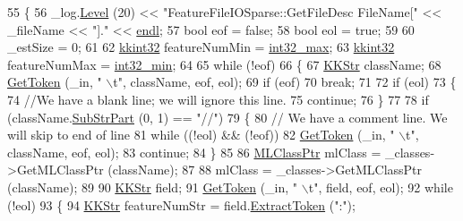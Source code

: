 \begin{DoxyCode}
55 \{
56   \_log.\hyperlink{class_k_k_b_1_1_run_log_a32cf761d7f2e747465fd80533fdbb659}{Level} (20) << \textcolor{stringliteral}{"FeatureFileIOSparse::GetFileDesc     FileName["} << \_fileName << \textcolor{stringliteral}{"]."} << 
      \hyperlink{namespace_k_k_b_ad1f50f65af6adc8fa9e6f62d007818a8}{endl};
57   \textcolor{keywordtype}{bool}  eof = \textcolor{keyword}{false};
58   \textcolor{keywordtype}{bool}  eol = \textcolor{keyword}{true};
59 
60   \_estSize = 0;
61 
62   \hyperlink{namespace_k_k_b_a8fa4952cc84fda1de4bec1fbdd8d5b1b}{kkint32}  featureNumMin = \hyperlink{_k_k_base_types_8h_ab1240c5d3fea865121ed4684f8e968f6}{int32\_max};
63   \hyperlink{namespace_k_k_b_a8fa4952cc84fda1de4bec1fbdd8d5b1b}{kkint32}  featureNumMax = \hyperlink{_k_k_base_types_8h_ab29398e623aa9027f097627dcc23e943}{int32\_min};
64 
65   \textcolor{keywordflow}{while}  (!eof)
66   \{
67     \hyperlink{class_k_k_b_1_1_k_k_str}{KKStr}  className;
68     \hyperlink{class_k_k_m_l_l_1_1_feature_file_i_o_ae79ac82b32e63fa7e7d96c833b5631f2}{GetToken} (\_in, \textcolor{stringliteral}{" \(\backslash\)t"}, className, eof, eol);
69     \textcolor{keywordflow}{if}  (eof)
70       \textcolor{keywordflow}{break};
71 
72     \textcolor{keywordflow}{if}  (eol)
73     \{
74       \textcolor{comment}{//We have a blank line; we will ignore this line.}
75       \textcolor{keywordflow}{continue};
76     \}
77 
78     \textcolor{keywordflow}{if}  (className.\hyperlink{class_k_k_b_1_1_k_k_str_a5f20b2ddfc9f07c8ef99592810332ddb}{SubStrPart} (0, 1) == \textcolor{stringliteral}{"//"})
79     \{
80       \textcolor{comment}{// We have a comment line.  We will skip to end of line}
81       \textcolor{keywordflow}{while}  ((!eol)  &&  (!eof))
82         \hyperlink{class_k_k_m_l_l_1_1_feature_file_i_o_ae79ac82b32e63fa7e7d96c833b5631f2}{GetToken} (\_in, \textcolor{stringliteral}{" \(\backslash\)t"}, className, eof, eol);
83       \textcolor{keywordflow}{continue};
84     \}
85 
86     \hyperlink{class_k_k_m_l_l_1_1_m_l_class}{MLClassPtr}  mlClass = \_classes->GetMLClassPtr (className);
87 
88     mlClass = \_classes->GetMLClassPtr (className);
89 
90     \hyperlink{class_k_k_b_1_1_k_k_str}{KKStr}  field;
91     \hyperlink{class_k_k_m_l_l_1_1_feature_file_i_o_ae79ac82b32e63fa7e7d96c833b5631f2}{GetToken} (\_in, \textcolor{stringliteral}{" \(\backslash\)t"}, field, eof, eol);
92     \textcolor{keywordflow}{while}  (!eol)
93     \{
94       \hyperlink{class_k_k_b_1_1_k_k_str}{KKStr}  featureNumStr = field.\hyperlink{class_k_k_b_1_1_k_k_str_acc31c95308d6d699debde883c11e5802}{ExtractToken} (\textcolor{stringliteral}{":"});

\end{DoxyCode}
